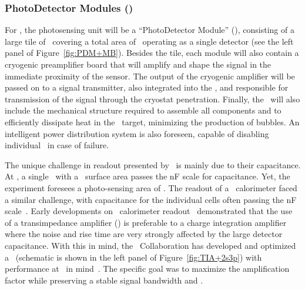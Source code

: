 \subsubsection{PhotoDetector Modules (\DSkPdm)}

For \DSks, the photosensing unit will be a ``PhotoDetector Module'' (\DSkPdm), consisting of a large tile of \SiPMs\ covering a total area of \DSkTileAreaStd\ operating as a single detector (see the left panel of Figure~\ref{fig:PDM+MB}).  Besides the tile, each module will also contain a cryogenic preamplifier board that will amplify and shape the signal in the immediate proximity of the sensor.  The output of the cryogenic amplifier will be passed on to a signal transmitter, also integrated into the \DSkPdm, and responsible for transmission of the signal through the cryostat penetration.  Finally, the \DSkPdm\ will also include the mechanical structure required to assemble all components and to efficiently dissipate heat in the \LAr\ target, minimizing the production of bubbles. An intelligent power distribution system is also foreseen, capable of disabling individual \DSkPdms\ in case of failure.

The unique challenge in readout presented by \SiPMs\ is mainly due to their capacitance. At \DSkSiPMCapacitancePerArea, a single \SiPM\ with a \DSkSiPMAreaStd\ surface area passes the \si{\nano\farad} scale for capacitance.  Yet, the experiment foresees a photo-sensing area of \DSkTilesArea.  The readout of a \LAr\ calorimeter faced a similar challenge, with capacitance for the individual cells often passing the \si{\nano\farad} scale~\cite{Willis:1974do}.  Early developments on \LAr\ calorimeter readout~\cite{Radeka:1974ca,Radeka:1988ku,Chase:1993dj,Chase:1997fk} demonstrated that the use of a transimpedance amplifier (\TIA) is preferable to a charge integration amplifier where the noise and rise time are very strongly affected by the large detector capacitance.  With this in mind, the \DS\ Collaboration has developed and optimized a \TIA\ (schematic is shown in the left panel of Figure~\ref{fig:TIA+2s3p}) with performance at \LArNormalTemperature\ in mind~\cite{DIncecco:2018fx}.  The specific goal was to maximize the amplification factor while preserving a stable signal bandwidth and \SNR.

